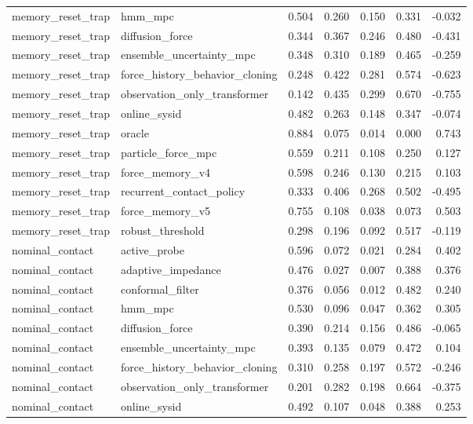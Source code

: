 \documentclass{article}
\begin{document}
\begin{longtable}{llrrrrr}
memory\_reset\_trap & hmm\_mpc & 0.504 & 0.260 & 0.150 & 0.331 & -0.032 \\
memory\_reset\_trap & diffusion\_force & 0.344 & 0.367 & 0.246 & 0.480 & -0.431 \\
memory\_reset\_trap & ensemble\_uncertainty\_mpc & 0.348 & 0.310 & 0.189 & 0.465 & -0.259 \\
memory\_reset\_trap & force\_history\_behavior\_cloning & 0.248 & 0.422 & 0.281 & 0.574 & -0.623 \\
memory\_reset\_trap & observation\_only\_transformer & 0.142 & 0.435 & 0.299 & 0.670 & -0.755 \\
memory\_reset\_trap & online\_sysid & 0.482 & 0.263 & 0.148 & 0.347 & -0.074 \\
memory\_reset\_trap & oracle & 0.884 & 0.075 & 0.014 & 0.000 & 0.743 \\
memory\_reset\_trap & particle\_force\_mpc & 0.559 & 0.211 & 0.108 & 0.250 & 0.127 \\
memory\_reset\_trap & force\_memory\_v4 & 0.598 & 0.246 & 0.130 & 0.215 & 0.103 \\
memory\_reset\_trap & recurrent\_contact\_policy & 0.333 & 0.406 & 0.268 & 0.502 & -0.495 \\
memory\_reset\_trap & force\_memory\_v5 & 0.755 & 0.108 & 0.038 & 0.073 & 0.503 \\
memory\_reset\_trap & robust\_threshold & 0.298 & 0.196 & 0.092 & 0.517 & -0.119 \\
nominal\_contact & active\_probe & 0.596 & 0.072 & 0.021 & 0.284 & 0.402 \\
nominal\_contact & adaptive\_impedance & 0.476 & 0.027 & 0.007 & 0.388 & 0.376 \\
nominal\_contact & conformal\_filter & 0.376 & 0.056 & 0.012 & 0.482 & 0.240 \\
nominal\_contact & hmm\_mpc & 0.530 & 0.096 & 0.047 & 0.362 & 0.305 \\
nominal\_contact & diffusion\_force & 0.390 & 0.214 & 0.156 & 0.486 & -0.065 \\
nominal\_contact & ensemble\_uncertainty\_mpc & 0.393 & 0.135 & 0.079 & 0.472 & 0.104 \\
nominal\_contact & force\_history\_behavior\_cloning & 0.310 & 0.258 & 0.197 & 0.572 & -0.246 \\
nominal\_contact & observation\_only\_transformer & 0.201 & 0.282 & 0.198 & 0.664 & -0.375 \\
nominal\_contact & online\_sysid & 0.492 & 0.107 & 0.048 & 0.388 & 0.253 \\

\end{longtable}
\end{document}
